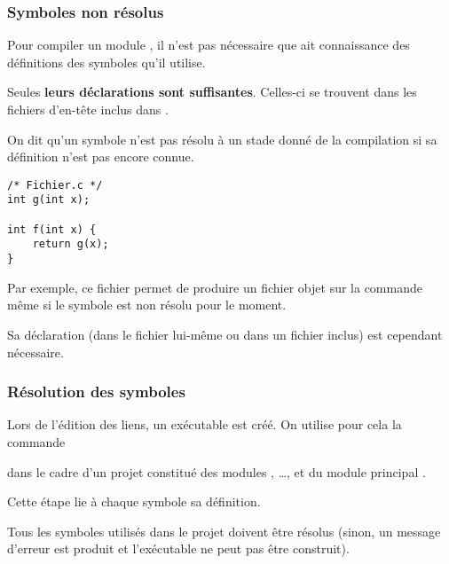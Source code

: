 \begin{frame}[fragile]
\frametitle{Symboles non résolus}
Pour compiler un module , il n'est pas nécessaire que 
ait connaissance des définitions des symboles qu'il utilise.
\medskip

Seules {\bf leurs déclarations sont suffisantes}. Celles-ci se trouvent
dans les fichiers d'en-tête inclus dans .
\bigskip

On dit qu'un symbole n'est pas \alert{résolu} à un stade donné de la
compilation si sa définition n'est pas encore connue.
\bigskip

\begin{minipage}[c]{.3\textwidth}
\begin{lstlisting}[frame=single,numbers=none]
/* Fichier.c */
int g(int x);

int f(int x) {
    return g(x);
}
\end{lstlisting}
\end{minipage}\qquad
\begin{minipage}[c]{.6\textwidth}
Par exemple, ce fichier permet de produire un fichier objet sur la commande
 même si le symbole  est non résolu pour
le moment.
\smallskip

Sa déclaration (dans le fichier lui-même ou dans un fichier inclus) est
cependant nécessaire.
\end{minipage}
\end{frame}

\begin{frame}[fragile]
\frametitle{Résolution des symboles}
Lors de l'édition des liens, un exécutable est créé. On utilise pour
cela la commande
\begin{center}  \end{center}
dans le cadre d'un projet constitué des modules , \dots, 
et du module principal .
\bigskip

Cette étape \alert{lie à chaque symbole sa définition}.
\bigskip
\bigskip

Tous les symboles utilisés dans le projet doivent être résolus (sinon,
un message d'erreur est produit et l'exécutable ne peut pas être
construit).
\end{frame}

